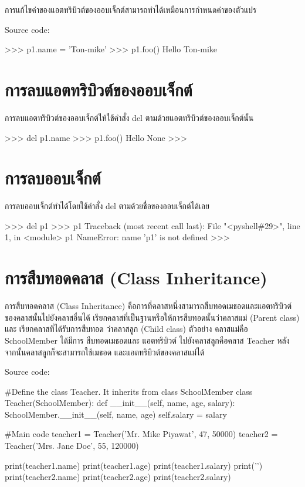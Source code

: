 การแก้ไขค่าของแอตทริบิวต์ของออบเจ็กต์สามารถทำได้เหมือนการกำหนดค่าของตัวแปร

Source code:
\begin{pycode}
>>> p1.name = 'Ton-mike'
>>> p1.foo()
Hello Ton-mike
\end{pycode}


\section{การลบแอตทริบิวต์ของออบเจ็กต์}

การลบแอตทริบิวต์ของออบเจ็กต์ให้ใช้คำสั่ง del ตามด้วยแอตทริบิวต์ของออบเจ็กต์นั้น
\begin{pycode}
>>> del p1.name
>>> p1.foo()
Hello None
>>> 
\end{pycode}

\section{การลบออบเจ็กต์}

การลบออบเจ็กต์ทำได้โดยใช้คำสั่ง del ตามด้วยชื่อของออบเจ็กต์ได้เลย

\begin{pycode}
>>> del p1
>>> p1
Traceback (most recent call last):
  File "<pyshell\#29>", line 1, in <module>
    p1
NameError: name 'p1' is not defined
>>> 
\end{pycode}

\section{การสืบทอดคลาส (Class Inheritance)}
การสืบทอดคลาส (Class Inheritance) คือการที่คลาสหนึ่งสามารถสืบทอดเมธอดและแอตทริบิวต์ ของคลาสนั้นไปยังคลาสอื่นได้ เรียกคลาสที่เป็นฐานหรือให้การสืบทอดนั้นว่าคลาสแม่ (Parent class) และ เรียกคลาสที่ได้รับการสืบทอด ว่าคลาสลูก (Child class) ตัวอย่าง คลาสแม่คือ SchoolMember ได้มีการ สืบทอดเมธอดและ แอตทริบิวต์ ไปยังคลาสลูกคือคลาส Teacher หลังจากนั้นคลาสลูกก็จะสามารถใช้เมธอด และแอตทริบิวต์ของคลาสแม่ได้

Source code:
\begin{pycode}
#Define the class Teacher. It inherits from class SchoolMember
class Teacher(SchoolMember):
    def __init__(self, name, age, salary):
        SchoolMember.__init__(self, name, age)
        self.salary = salary

#Main code
teacher1 = Teacher('Mr. Mike Piyawat', 47, 50000)
teacher2 = Teacher('Mrs. Jane Doe', 55, 120000)

print(teacher1.name)
print(teacher1.age)
print(teacher1.salary)
print('\n')
print(teacher2.name)
print(teacher2.age)
print(teacher2.salary)
\end{pycode}

